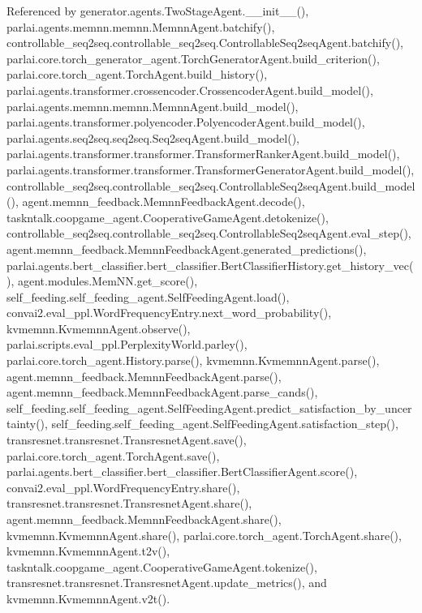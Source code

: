 Referenced by generator.\+agents.\+Two\+Stage\+Agent.\+\_\+\+\_\+init\+\_\+\+\_\+(), parlai.\+agents.\+memnn.\+memnn.\+Memnn\+Agent.\+batchify(), controllable\+\_\+seq2seq.\+controllable\+\_\+seq2seq.\+Controllable\+Seq2seq\+Agent.\+batchify(), parlai.\+core.\+torch\+\_\+generator\+\_\+agent.\+Torch\+Generator\+Agent.\+build\+\_\+criterion(), parlai.\+core.\+torch\+\_\+agent.\+Torch\+Agent.\+build\+\_\+history(), parlai.\+agents.\+transformer.\+crossencoder.\+Crossencoder\+Agent.\+build\+\_\+model(), parlai.\+agents.\+memnn.\+memnn.\+Memnn\+Agent.\+build\+\_\+model(), parlai.\+agents.\+transformer.\+polyencoder.\+Polyencoder\+Agent.\+build\+\_\+model(), parlai.\+agents.\+seq2seq.\+seq2seq.\+Seq2seq\+Agent.\+build\+\_\+model(), parlai.\+agents.\+transformer.\+transformer.\+Transformer\+Ranker\+Agent.\+build\+\_\+model(), parlai.\+agents.\+transformer.\+transformer.\+Transformer\+Generator\+Agent.\+build\+\_\+model(), controllable\+\_\+seq2seq.\+controllable\+\_\+seq2seq.\+Controllable\+Seq2seq\+Agent.\+build\+\_\+model(), agent.\+memnn\+\_\+feedback.\+Memnn\+Feedback\+Agent.\+decode(), taskntalk.\+coopgame\+\_\+agent.\+Cooperative\+Game\+Agent.\+detokenize(), controllable\+\_\+seq2seq.\+controllable\+\_\+seq2seq.\+Controllable\+Seq2seq\+Agent.\+eval\+\_\+step(), agent.\+memnn\+\_\+feedback.\+Memnn\+Feedback\+Agent.\+generated\+\_\+predictions(), parlai.\+agents.\+bert\+\_\+classifier.\+bert\+\_\+classifier.\+Bert\+Classifier\+History.\+get\+\_\+history\+\_\+vec(), agent.\+modules.\+Mem\+N\+N.\+get\+\_\+score(), self\+\_\+feeding.\+self\+\_\+feeding\+\_\+agent.\+Self\+Feeding\+Agent.\+load(), convai2.\+eval\+\_\+ppl.\+Word\+Frequency\+Entry.\+next\+\_\+word\+\_\+probability(), kvmemnn.\+Kvmemnn\+Agent.\+observe(), parlai.\+scripts.\+eval\+\_\+ppl.\+Perplexity\+World.\+parley(), parlai.\+core.\+torch\+\_\+agent.\+History.\+parse(), kvmemnn.\+Kvmemnn\+Agent.\+parse(), agent.\+memnn\+\_\+feedback.\+Memnn\+Feedback\+Agent.\+parse(), agent.\+memnn\+\_\+feedback.\+Memnn\+Feedback\+Agent.\+parse\+\_\+cands(), self\+\_\+feeding.\+self\+\_\+feeding\+\_\+agent.\+Self\+Feeding\+Agent.\+predict\+\_\+satisfaction\+\_\+by\+\_\+uncertainty(), self\+\_\+feeding.\+self\+\_\+feeding\+\_\+agent.\+Self\+Feeding\+Agent.\+satisfaction\+\_\+step(), transresnet.\+transresnet.\+Transresnet\+Agent.\+save(), parlai.\+core.\+torch\+\_\+agent.\+Torch\+Agent.\+save(), parlai.\+agents.\+bert\+\_\+classifier.\+bert\+\_\+classifier.\+Bert\+Classifier\+Agent.\+score(), convai2.\+eval\+\_\+ppl.\+Word\+Frequency\+Entry.\+share(), transresnet.\+transresnet.\+Transresnet\+Agent.\+share(), agent.\+memnn\+\_\+feedback.\+Memnn\+Feedback\+Agent.\+share(), kvmemnn.\+Kvmemnn\+Agent.\+share(), parlai.\+core.\+torch\+\_\+agent.\+Torch\+Agent.\+share(), kvmemnn.\+Kvmemnn\+Agent.\+t2v(), taskntalk.\+coopgame\+\_\+agent.\+Cooperative\+Game\+Agent.\+tokenize(), transresnet.\+transresnet.\+Transresnet\+Agent.\+update\+\_\+metrics(), and kvmemnn.\+Kvmemnn\+Agent.\+v2t().

